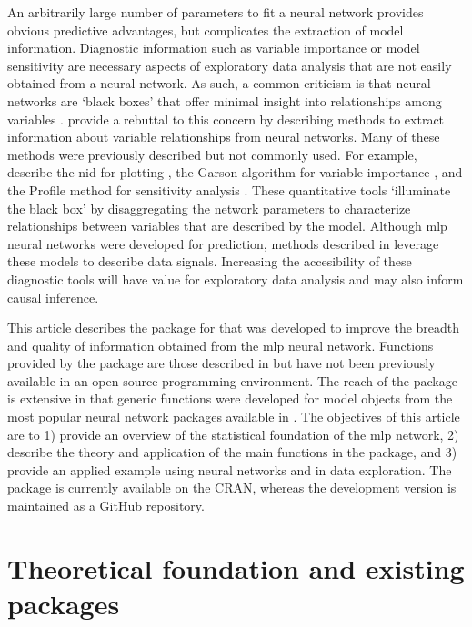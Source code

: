\documentclass[article,shortnames]{jss}
\begin{document}
An arbitrarily large number of parameters to fit a neural network provides obvious predictive advantages, but complicates the extraction of model information.  Diagnostic information such as variable importance or model sensitivity are necessary aspects of exploratory data analysis that are not easily obtained from a neural network. As such, a common criticism is that neural networks are `black boxes' that offer minimal insight into relationships among variables \citep[e.g.,][]{Paruelo97}.  \citet{Olden02} provide a rebuttal to this concern by describing methods to extract information about variable relationships from neural networks.  Many of these methods were previously described but not commonly used.  For example, \citet{Olden02} describe  the \ac{nid} for plotting \citep{Ozesmi99}, the Garson algorithm for variable importance \citep{Garson91}, and the Profile method for sensitivity analysis \citep{Lek96}.  These quantitative tools `illuminate the black box' by disaggregating the network parameters to characterize relationships between variables that are described by the model.  Although \ac{mlp} neural networks were developed for prediction, methods described in \citet{Olden02} leverage these models to describe data signals.  Increasing the accesibility of these diagnostic tools will have value for exploratory data analysis and may also inform causal inference.

This article describes the  package for  that was developed to improve the breadth and quality of information obtained from the \ac{mlp} neural network.  Functions provided by the package are those described in \citet{Olden02} but have not been previously available in an open-source programming environment.  The reach of the package is extensive in that generic functions were developed for model objects from the most popular neural network packages available in .  The objectives of this article are to 1) provide an overview of the statistical foundation of the \ac{mlp} network, 2) describe the theory and application of the main functions in the  package, and 3) provide an applied example using neural networks and  in data exploration.  The package is currently available on the \ac{CRAN}, whereas the development version is maintained as a GitHub repository.  

\section[Theoretical foundation]{Theoretical foundation and existing  packages}
\end{document}
